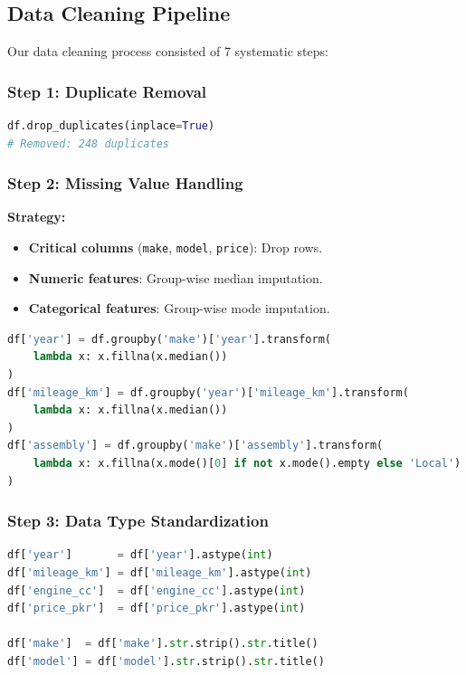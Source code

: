 \documentclass[12pt,a4paper]{article}
\begin{document}
\subsection{Data Cleaning Pipeline}

Our data cleaning process consisted of 7 systematic steps:

\subsubsection{Step 1: Duplicate Removal}

\begin{lstlisting}[language=Python, caption=Duplicate Removal]
df.drop_duplicates(inplace=True)
# Removed: 248 duplicates
\end{lstlisting}

\subsubsection{Step 2: Missing Value Handling}

\textbf{Strategy:}
\begin{itemize}
    \item \textbf{Critical columns} (\texttt{make}, \texttt{model}, \texttt{price}): Drop rows.
    \item \textbf{Numeric features}: Group-wise median imputation.
    \item \textbf{Categorical features}: Group-wise mode imputation.
\end{itemize}

\begin{lstlisting}[language=Python, caption=Missing Value Imputation]
df['year'] = df.groupby('make')['year'].transform(
    lambda x: x.fillna(x.median())
)
df['mileage_km'] = df.groupby('year')['mileage_km'].transform(
    lambda x: x.fillna(x.median())
)
df['assembly'] = df.groupby('make')['assembly'].transform(
    lambda x: x.fillna(x.mode()[0] if not x.mode().empty else 'Local')
)
\end{lstlisting}

\subsubsection{Step 3: Data Type Standardization}

\begin{lstlisting}[language=Python, caption=Type Conversion]
df['year']       = df['year'].astype(int)
df['mileage_km'] = df['mileage_km'].astype(int)
df['engine_cc']  = df['engine_cc'].astype(int)
df['price_pkr']  = df['price_pkr'].astype(int)

df['make']  = df['make'].str.strip().str.title()
df['model'] = df['model'].str.strip().str.title()
\end{lstlisting}
\end{document}
